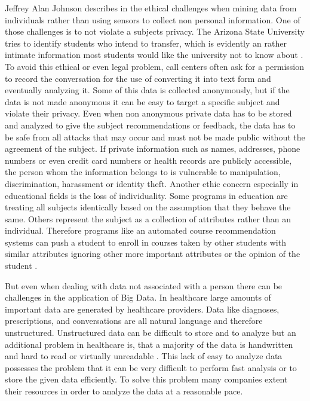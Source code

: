 \documentclass[runningheads]{llncs}
\begin{document}
Jeffrey Alan Johnson describes in \cite{JOHNSON} the ethical challenges when mining data from individuals rather than using sensors to collect non personal information. One of those challenges is to not violate a subjects privacy. The Arizona State University tries to identify students who intend to transfer, which is evidently an rather intimate information most students would like the university not to know about \cite{JOHNSON}. To avoid this ethical or even legal problem, call centers often ask for a permission to record the conversation for the use of converting it into text form and eventually analyzing it. Some of this data is collected anonymously, but if the data is not made anonymous it can be easy to target a specific subject and violate their privacy. Even when non anonymous private data has to be stored and analyzed to give the subject recommendations or feedback, the data has to be safe from all attacks that may occur and must not be made public without the agreement of the subject. If private information such as names, addresses, phone numbers or even credit card numbers or health records are publicly accessible, the person whom the information belongs to is vulnerable to manipulation, discrimination, harassment or identity theft.
Another ethic concern especially in educational fields is the loss of individuality. Some programs in education are treating all subjects identically based on the assumption that they behave the same. Others represent the subject as a collection of attributes rather than an individual. Therefore programs like an automated course recommendation systems can push a student to enroll in courses taken by other students with similar attributes ignoring other more important attributes or the opinion of the student \cite{JOHNSON}.

But even when dealing with data not associated with a person there can be challenges in the application of Big Data. In healthcare large amounts of important data are generated by healthcare providers. Data like diagnoses, prescriptions, and conversations are all natural language and therefore unstructured. Unstructured data can be difficult to store and to analyze but an additional problem in healthcare is, that a majority of the data is handwritten and hard to read or virtually unreadable \cite{FELDMAN}. This lack of easy to analyze data possesses the problem that it can be very difficult to perform fast analysis or to store the given data efficiently. To solve this problem many companies extent their resources in order to analyze the data at a reasonable pace. 
\end{document}
